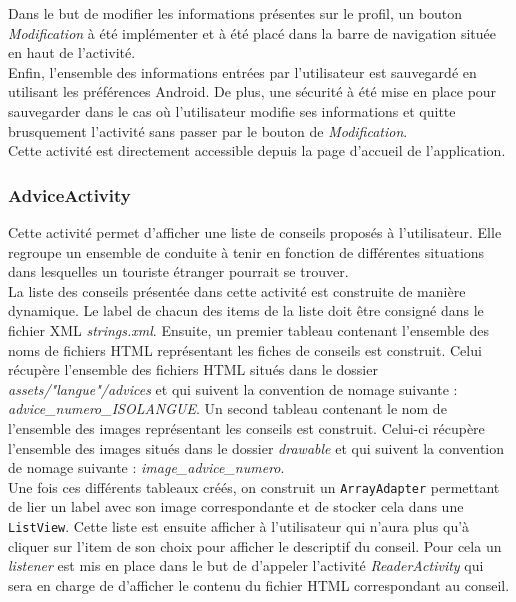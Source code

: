 	Dans le but de modifier les informations présentes sur le profil, un bouton \emph{Modification} à été implémenter et à été placé dans la barre de navigation située en haut de l'activité.
	\\
	
	Enfin, l'ensemble des informations entrées par l'utilisateur est sauvegardé en utilisant les préférences Android. De plus, une sécurité à été mise en place pour sauvegarder dans le cas où l'utilisateur modifie ses informations et quitte brusquement l'activité sans passer par le bouton de \emph{Modification}.
	\\
	
	Cette activité est directement accessible depuis la page d'accueil de l'application.

\subsubsection{AdviceActivity}
	Cette activité permet d'afficher une liste de conseils proposés à l'utilisateur. Elle regroupe un ensemble de conduite à tenir en fonction de différentes situations dans lesquelles un touriste étranger pourrait se trouver.
	\\
		
	La liste des conseils présentée dans cette activité est construite de manière dynamique. Le label de chacun des items de la liste doit être consigné dans le fichier XML \emph{strings.xml}. Ensuite, un premier tableau contenant l'ensemble des noms de fichiers HTML représentant les fiches de conseils est construit. Celui récupère l'ensemble des fichiers HTML situés dans le dossier \emph{assets/"langue"/advices} et qui suivent la convention de nomage suivante : \emph{advice\_numero\_ISOLANGUE}. Un second tableau contenant le nom de l'ensemble des images représentant les conseils est construit. Celui-ci récupère l'ensemble des images situés dans le dossier \emph{drawable} et qui suivent la convention de nomage suivante : \emph{image\_advice\_numero}.
	\\
	
	Une fois ces différents tableaux créés, on construit un \texttt{ArrayAdapter} permettant de lier un label avec son image correspondante et de stocker cela dans une \texttt{ListView}. Cette liste est ensuite afficher à l'utilisateur qui n'aura plus qu'à cliquer sur l'item de son choix pour afficher le descriptif du conseil. Pour cela un \emph{listener} est mis en place dans le but de d'appeler l'activité \emph{ReaderActivity} qui sera en charge de d'afficher le contenu du fichier HTML correspondant au conseil.
	\\
	
